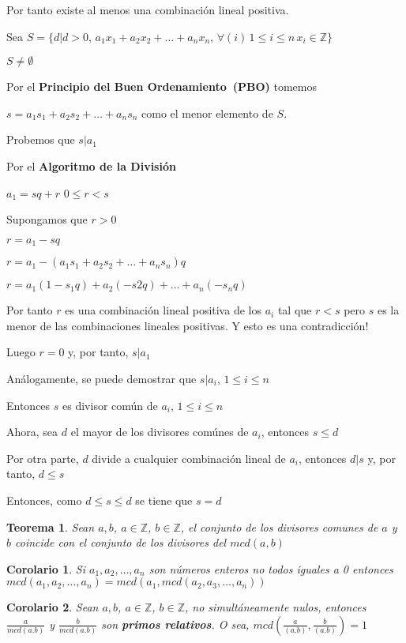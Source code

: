 \documentclass[a4paper,1pt]{report}
\newtheorem*{teo}{Teorema}
\newtheorem*{cor}{Corolario}
\begin{document}
Por tanto existe al menos una combinación lineal positiva.

Sea $S=\{d|d>0,\, a_1x_1+a_2x_2+\dots+a_nx_n,\, \forall (i)\, 1\leq i \leq n\, x_i\in\mathbb{Z}\}$

$S\neq \emptyset$

Por el \textbf{Principio del Buen Ordenamiento~(PBO)} tomemos 

$s=a_1s_1+a_2s_2+\dots+a_ns_n$ como el menor elemento de $S$.

Probemos que $s|a_1$

Por el \textbf{Algoritmo de la División}

$a_1=sq+r$ $0\leq r < s$ 

Supongamos que $r>0$

$r=a_1-sq$

$r=a_1 - (a_1s_1+a_2s_2+\dots+a_ns_n)q$

$r=a_1(1-s_1q)+a_2(-s2q)+\dots+a_n(-s_nq)$

Por tanto $r$ es una combinación lineal positiva de los $a_i$ tal que $r<s$ pero $s$ es la menor de las combinaciones lineales positivas. Y esto es una contradicción! 

Luego $r=0$ y, por tanto, $s|a_1$

Análogamente, se puede demostrar que $s|a_i,\, 1\leq i \leq n$

Entonces $s$ es divisor común de $a_i,\, 1\leq i \leq n$

Ahora, sea $d$ el mayor de los divisores comúnes de $a_i$, entonces $s\leq d$

Por otra parte, $d$ divide a cualquier combinación lineal de $a_i$, entonces $d|s$ y, por tanto, $d\leq s$

Entonces, como $d\leq s \leq d$ se tiene que $s=d$

\begin{teo}
 Sean $a,b$, $a\in\mathbb{Z}$, $b\in\mathbb{Z}$, el conjunto de los divisores comunes de $a$ y $b$ coincide con el conjunto de los divisores del $mcd(a,b)$
\end{teo}

\begin{cor}
 Si $a_1,a_2,\dots,a_n$ son números enteros no todos iguales a 0 entonces $mcd(a_1,a_2,\dots,a_n)=mcd(a_1,mcd(a_2,a_3,\dots,a_n))$
\end{cor}

\begin{cor}
 Sean $a,b$, $a\in\mathbb{Z}$, $b\in\mathbb{Z}$, no simultáneamente nulos, entonces $\frac{a}{mcd(a.b)}$ y  $\frac{b}{mcd(a.b)}$ son \textbf{primos relativos}. O sea, $mcd(\frac{a}{(a.b)},\frac{b}{(a.b)})=1$
\end{cor}
\end{document}
